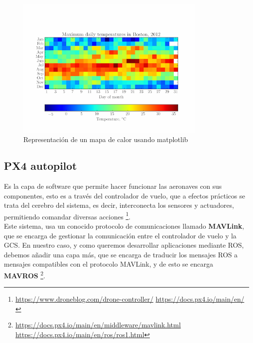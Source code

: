 \begin{figure} [H]
	\begin{center}
	\includegraphics[height=7cm]{imagenes/cap3/6_matplotlib_app.png}
	\end{center}
	\caption[Representación de un mapa de calor usando matplotlib]{Representación de un mapa de calor usando matplotlib}
	\label{fig:matplotlib}
\end{figure}

\subsection{PX4 autopilot}
\label{subsec:px4}

Es la capa de software que permite hacer funcionar las aeronaves con sus componentes, esto es a través del controlador de vuelo, que a efectos prácticos se trata del cerebro del sistema, es decir, interconecta los sensores y actuadores, permitiendo comandar diversas acciones \footnote[14]{\url{https://www.droneblog.com/drone-controller/} \url{https://docs.px4.io/main/en/}}.\\

Este sistema, usa un conocido protocolo de comunicaciones llamado \textbf{MAVLink}, que se encarga de gestionar la comunicación entre el controlador de vuelo y la \ac{GCS}. En nuestro caso, y como queremos desarrollar aplicaciones mediante \ac{ROS}, debemos añadir una capa más, que se encarga de traducir los mensajes ROS a mensajes compatibles con el protocolo MAVLink, y de esto se encarga \textbf{MAVROS} \footnote[15]{\url{https://docs.px4.io/main/en/middleware/mavlink.html} \url{https://docs.px4.io/main/en/ros/ros1.html}}.\\


